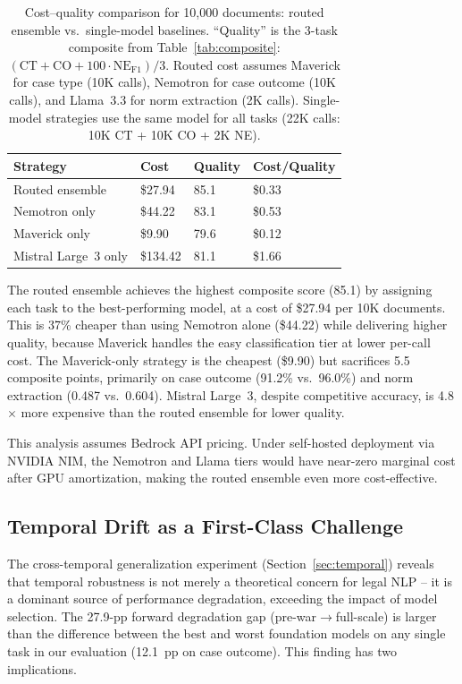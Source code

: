 \documentclass[11pt,a4paper]{article}
\begin{document}
\begin{table}[t]
\centering
\caption{Cost--quality comparison for 10,000 documents: routed ensemble vs.\ single-model baselines. ``Quality'' is the 3-task composite from Table~\ref{tab:composite}: $(\text{CT} + \text{CO} + 100 \cdot \text{NE}_{\text{F1}}) / 3$. Routed cost assumes Maverick for case type (10K calls), Nemotron for case outcome (10K calls), and Llama~3.3 for norm extraction (2K calls). Single-model strategies use the same model for all tasks (22K calls: 10K CT + 10K CO + 2K NE).}
\label{tab:routing}
\small
\begin{tabular}{lR{2.0cm}R{2.0cm}R{2.0cm}}
\toprule
\textbf{Strategy} & \textbf{Cost} & \textbf{Quality} & \textbf{Cost/Quality} \\
\midrule
Routed ensemble         & \$27.94  & 85.1 & \$0.33 \\
Nemotron only           & \$44.22  & 83.1 & \$0.53 \\
Maverick only           & \$9.90   & 79.6 & \$0.12 \\
Mistral Large~3 only    & \$134.42 & 81.1 & \$1.66 \\
\bottomrule
\end{tabular}
\end{table}

The routed ensemble achieves the highest composite score (85.1) by assigning each task to the best-performing model, at a cost of \$27.94 per 10K documents. This is 37\% cheaper than using Nemotron alone (\$44.22) while delivering higher quality, because Maverick handles the easy classification tier at lower per-call cost. The Maverick-only strategy is the cheapest (\$9.90) but sacrifices 5.5 composite points, primarily on case outcome (91.2\% vs.\ 96.0\%) and norm extraction (0.487 vs.\ 0.604). Mistral Large~3, despite competitive accuracy, is 4.8$\times$ more expensive than the routed ensemble for lower quality.

This analysis assumes Bedrock API pricing. Under self-hosted deployment via NVIDIA NIM, the Nemotron and Llama tiers would have near-zero marginal cost after GPU amortization, making the routed ensemble even more cost-effective.

\subsection{Temporal Drift as a First-Class Challenge}

The cross-temporal generalization experiment (Section~\ref{sec:temporal}) reveals that temporal robustness is not merely a theoretical concern for legal NLP -- it is a dominant source of performance degradation, exceeding the impact of model selection. The 27.9-pp forward degradation gap (pre-war$\rightarrow$full-scale) is larger than the difference between the best and worst foundation models on any single task in our evaluation (12.1~pp on case outcome). This finding has two implications.
\end{document}
